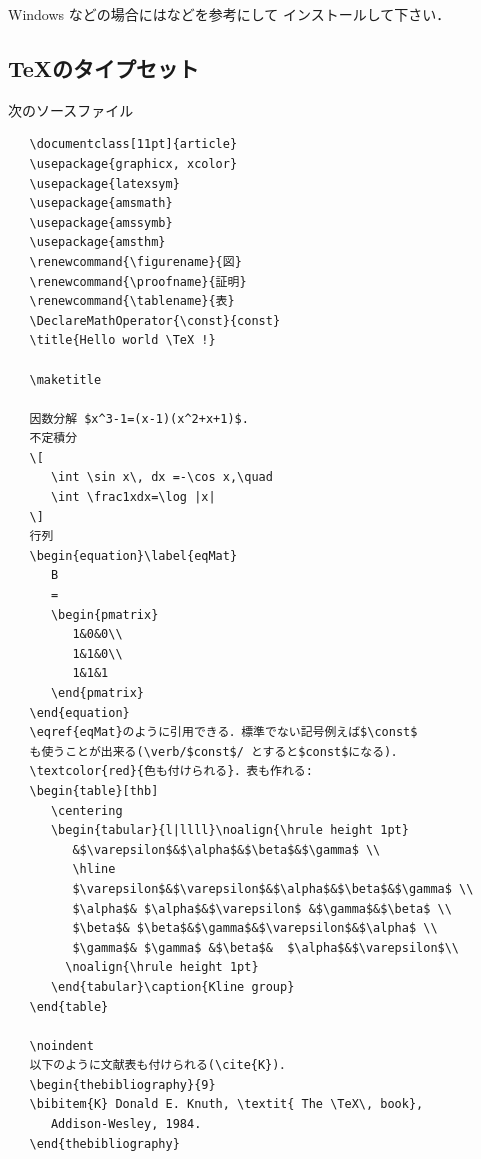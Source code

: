       Windows などの場合には\cite{OK}などを参考にして
      インストールして下さい．

\subsection{\TeX のタイプセット}
次のソースファイル   
\begin{verbatim}
   \documentclass[11pt]{article}
   \usepackage{graphicx, xcolor}
   \usepackage{latexsym}
   \usepackage{amsmath}
   \usepackage{amssymb}
   \usepackage{amsthm}
   \renewcommand{\figurename}{図}
   \renewcommand{\proofname}{証明}
   \renewcommand{\tablename}{表}
   \DeclareMathOperator{\const}{const}
   \title{Hello world \TeX !}
   
   \maketitle
   
   因数分解 $x^3-1=(x-1)(x^2+x+1)$. 
   不定積分
   \[
      \int \sin x\, dx =-\cos x,\quad 
      \int \frac1xdx=\log |x|
   \]
   行列
   \begin{equation}\label{eqMat}
      B
      =
      \begin{pmatrix}
         1&0&0\\
         1&1&0\\
         1&1&1
      \end{pmatrix}
   \end{equation}
   \eqref{eqMat}のように引用できる．標準でない記号例えば$\const$
   も使うことが出来る(\verb/$const$/ とすると$const$になる)．
   \textcolor{red}{色も付けられる}．表も作れる:  
   \begin{table}[thb]
      \centering
      \begin{tabular}{l|llll}\noalign{\hrule height 1pt}
         &$\varepsilon$&$\alpha$&$\beta$&$\gamma$ \\ 
         \hline
         $\varepsilon$&$\varepsilon$&$\alpha$&$\beta$&$\gamma$ \\
         $\alpha$& $\alpha$&$\varepsilon$ &$\gamma$&$\beta$ \\
         $\beta$& $\beta$&$\gamma$&$\varepsilon$&$\alpha$ \\ 
         $\gamma$& $\gamma$ &$\beta$&  $\alpha$&$\varepsilon$\\
        \noalign{\hrule height 1pt}
      \end{tabular}\caption{Kline group}
   \end{table}
   
   \noindent
   以下のように文献表も付けられる(\cite{K})．
   \begin{thebibliography}{9}
   \bibitem{K} Donald E. Knuth, \textit{ The \TeX\, book}, 
      Addison-Wesley, 1984.
   \end{thebibliography}
   
 \end{verbatim}

